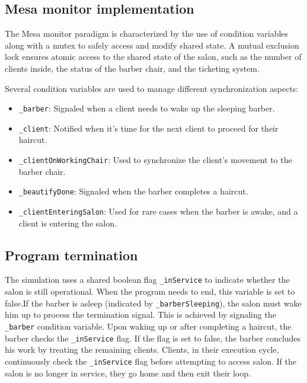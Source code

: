 \documentclass{article}
\begin{document}
    \pagebreak

    \subsection{Mesa monitor implementation}

    The Mesa monitor paradigm is characterized by the use of condition variables along with a mutex to safely access and modify shared state. A mutual exclusion lock ensures atomic access to the shared state of the salon, such as the number of clients inside, the status of the barber chair, and the ticketing system.

    Several condition variables are used to manage different synchronization aspects:
    \begin{itemize}
        \item \texttt{\_barber}: Signaled when a client needs to wake up the sleeping barber.
        \item \texttt{\_client}: Notified when it's time for the next client to proceed for their haircut.
        \item \texttt{\_clientOnWorkingChair}: Used to synchronize the client's movement to the barber chair.
        \item \texttt{\_beautifyDone}: Signaled when the barber completes a haircut.
        \item \texttt{\_clientEnteringSalon}: Used for rare cases when the barber is awake, and a client is entering the salon.
    \end{itemize}

    \subsection{Program termination}
    The simulation uses a shared boolean flag \texttt{\_inService} to indicate whether the salon is still operational. When the program needs to end, this variable is set to false.If the barber is asleep (indicated by \texttt{\_barberSleeping}), the salon must wake him up to process the termination signal. This is achieved by signaling the \texttt{\_barber} condition variable. Upon waking up or after completing a haircut, the barber checks the \texttt{\_inService} flag. If the flag is set to false, the barber concludes his work by treating the remaining clients. Clients, in their execution cycle, continuously check the \texttt{\_inService} flag before attempting to access salon. If the salon is no longer in service, they go home and then exit their loop.
\end{document}
